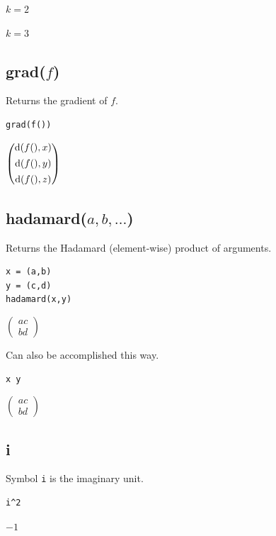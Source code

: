 \documentclass[12pt]{article}
\begin{document}
$k=2$

$k=3$

\subsection*{grad($f$)}

Returns the gradient of $f$.

{\color{blue}
\begin{verbatim}
grad(f())
\end{verbatim}
}

$\displaystyle
\begin{pmatrix}
{\rm d}(f(),x)
\\[1ex]
{\rm d}(f(),y)
\\[1ex]
{\rm d}(f(),z)
\end{pmatrix}
$

\subsection*{hadamard($a,b,\ldots$)}

Returns the Hadamard (element-wise) product of arguments.

{\color{blue}
\begin{verbatim}
x = (a,b)
y = (c,d)
hadamard(x,y)
\end{verbatim}
}

$
\begin{pmatrix}
a c
\\[1ex]
b d
\end{pmatrix}
$

\bigskip
Can also be accomplished this way.

{\color{blue}
\begin{verbatim}
x y
\end{verbatim}
}

$
\begin{pmatrix}
a c
\\[1ex]
b d
\end{pmatrix}
$

\subsection*{i}

Symbol {\tt i} is the imaginary unit.

{\color{blue}
\begin{verbatim}
i^2
\end{verbatim}
}

$-1$
\end{document}
